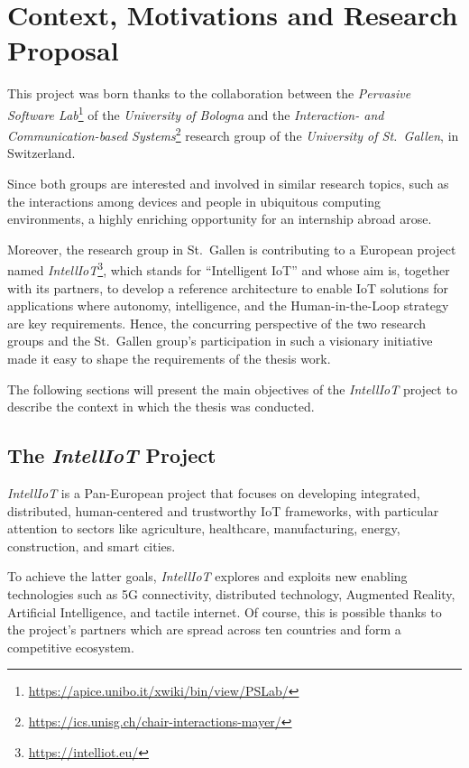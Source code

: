 \chapter{Context, Motivations and Research Proposal}\label{context}
This project was born thanks to the collaboration between the \textit{Pervasive Software Lab}\footnote{\href{https://apice.unibo.it/xwiki/bin/view/PSLab/}{https://apice.unibo.it/xwiki/bin/view/PSLab/}} of the \textit{University of Bologna} and the \textit{Interaction- and Communication-based Systems}\footnote{\href{https://ics.unisg.ch/chair-interactions-mayer/}{https://ics.unisg.ch/chair-interactions-mayer/}} research group of the \textit{University of St.\ Gallen}, in Switzerland.

Since both groups are interested and involved in similar research topics, such as the interactions among devices and people in ubiquitous computing environments, a highly enriching opportunity for an internship abroad arose.

Moreover, the research group in St.\ Gallen is contributing to a European project named \textit{IntellIoT}\footnote{\href{https://intelliot.eu/}{https://intelliot.eu/}}, which stands for ``Intelligent IoT'' and whose aim is, together with its partners, to develop a reference architecture to enable IoT solutions for applications where autonomy, intelligence, and the Human-in-the-Loop strategy are key requirements.
Hence, the concurring perspective of the two research groups and the St.\ Gallen group's participation in such a visionary initiative made it easy to shape the requirements of the thesis work.

The following sections will present the main objectives of the \textit{IntellIoT} project to describe the context in which the thesis was conducted.

\newpage

\section{The \textit{IntellIoT} Project}\label{intelliot-project}
\textit{IntellIoT} is a Pan-European project that focuses on developing integrated, distributed, human-centered and trustworthy IoT frameworks, with particular attention to sectors like agriculture, healthcare, manufacturing, energy, construction, and smart cities.

To achieve the latter goals, \textit{IntellIoT} explores and exploits new enabling technologies such as 5G connectivity, distributed technology, Augmented Reality, Artificial Intelligence, and tactile internet.
Of course, this is possible thanks to the project's partners which are spread across ten countries and form a competitive ecosystem.

